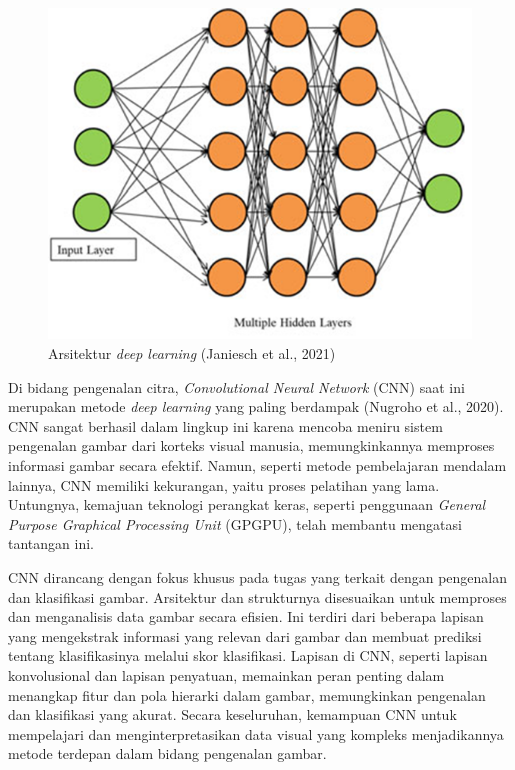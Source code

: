 \begin{figure}[H]
  \centering
  \includegraphics[scale=1]{gambar/arsitekturdlnn.png}
  \caption{Arsitektur \emph{deep learning} (Janiesch et al., 2021)}
  \label{fig:arsidl}
\end{figure}


Di bidang pengenalan citra, \emph{Convolutional Neural Network} (CNN) saat ini merupakan metode \emph{deep learning} yang paling berdampak (Nugroho et al., 2020). CNN sangat berhasil dalam lingkup ini karena mencoba meniru sistem pengenalan gambar dari korteks visual manusia, memungkinkannya memproses informasi gambar secara efektif. Namun, seperti metode pembelajaran mendalam lainnya, CNN memiliki kekurangan, yaitu proses pelatihan yang lama. Untungnya, kemajuan teknologi perangkat keras, seperti penggunaan \emph{General Purpose Graphical Processing Unit} (GPGPU), telah membantu mengatasi tantangan ini.

CNN dirancang dengan fokus khusus pada tugas yang terkait dengan pengenalan dan klasifikasi gambar. Arsitektur dan strukturnya disesuaikan untuk memproses dan menganalisis data gambar secara efisien. Ini terdiri dari beberapa lapisan yang mengekstrak informasi yang relevan dari gambar dan membuat prediksi tentang klasifikasinya melalui skor klasifikasi. Lapisan di CNN, seperti lapisan konvolusional dan lapisan penyatuan, memainkan peran penting dalam menangkap fitur dan pola hierarki dalam gambar, memungkinkan pengenalan dan klasifikasi yang akurat. Secara keseluruhan, kemampuan CNN untuk mempelajari dan menginterpretasikan data visual yang kompleks menjadikannya metode terdepan dalam bidang pengenalan gambar.

